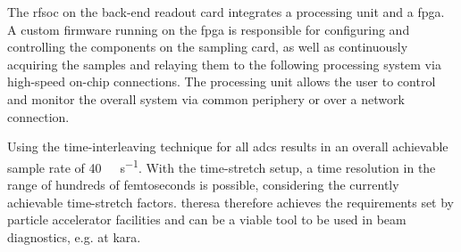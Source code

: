 The \gls{rfsoc} on the back-end readout card integrates a processing unit and a \gls{fpga}. 
A custom firmware running on the \gls{fpga} is responsible for configuring and controlling the components on the sampling card, as well as continuously acquiring the samples and relaying them to the following processing system via high-speed on-chip connections.
The processing unit allows the user to control and monitor the overall system via common periphery or over a network connection.

Using the time-interleaving technique for all \glspl{adc} results in an overall achievable sample rate of \SI{40}{\giga \sample \per \second}.
With the time-stretch setup, a time resolution in the range of hundreds of femtoseconds is possible, considering the currently achievable time-stretch factors.
\gls{theresa} therefore achieves the requirements set by particle accelerator facilities and can be a viable tool to be used in beam diagnostics, e.g. at \gls{kara}.
